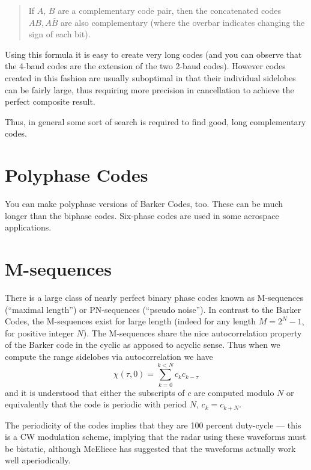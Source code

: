 \begin{quote}
If $A$, $B$ are a complementary code pair, then the concatenated codes
$AB, A\bar{B}$ are also complementary (where the overbar indicates
changing the sign of each bit).
\end{quote}

Using this formula it is easy to create very long codes (and you can
observe that the 4-baud codes are the extension of the two 2-baud
codes).  However codes created in this fashion are usually suboptimal
in that their individual sidelobes can be fairly large, thus requiring
more precision in cancellation to achieve the perfect composite result.

Thus, in general some sort of search is required to find good, long
complementary codes.

\section{Polyphase Codes}

You can make polyphase versions of Barker Codes, too.  These can be
much longer than the biphase codes.  Six-phase codes are used in some
aerospace applications.

\section{M-sequences}

There is a large class of nearly perfect binary phase codes known as
M-sequences (``maximal length'') or PN-sequences (``pseudo noise'').
In contrast to the Barker Codes, the M-sequences exist for large
length (indeed for any length $M = 2^N - 1$, for positive integer
$N$).   The M-sequences share the nice autocorrelation property of the
Barker code in the cyclic as apposed to acyclic sense.  Thus when we
compute the range sidelobes via autocorrelation we have
\begin{equation}
\chi(\tau,0) = \sum_{k=0}^{k < N} c_k c_{k-\tau}
\end{equation}
and it is understood that either the subscripts of $c$ are computed
modulo $N$ or equivalently that the code is periodic with period $N$,
$c_k = c_{k+N}$.

The periodicity of the codes implies that they are 100 percent
duty-cycle --- this is a CW modulation scheme, implying that the radar
using these waveforms must be bistatic, although McEliece has
suggested that the waveforms actually work well aperiodically.

